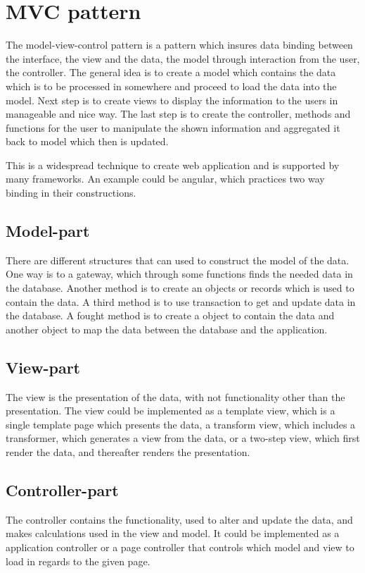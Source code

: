 \section{MVC pattern}
The model-view-control pattern is a pattern which insures data binding between the interface, the view and the data, the model through interaction from the user, the controller.
The general idea is to create a model which contains the data which is to be processed in somewhere and proceed to load the data into the model.
Next step is to create views to display the information to the users in manageable and nice way. The last step is to create the controller, methods and functions for the user to manipulate the shown information and aggregated it back to model which then is updated.

This is a widespread technique to create web application and is supported by many frameworks. An example could be angular, which practices two way binding in their constructions.

\subsection{Model-part}
There are different structures that can used to construct the model of the data. One way is to a gateway, which through some functions finds the needed data in the database. Another method is to create an objects or records which is used to contain the data. A third method is to use transaction to get and update data in the database. A fought method is to create a object to contain the data and another object to map the data between the database and the application.

\subsection{View-part}
The view is the presentation of the data, with not functionality other than the presentation. The view could be implemented as a template view, which is a single template page which presents the data, a transform view, which includes a transformer, which generates a view from the data, or a two-step view, which first render the data, and thereafter renders the presentation.

\subsection{Controller-part}
The controller contains the functionality, used to alter and update the data, and makes calculations used in the view and model. It could be implemented as a application controller or a page controller that controls which model and view to load in regards to the given page.